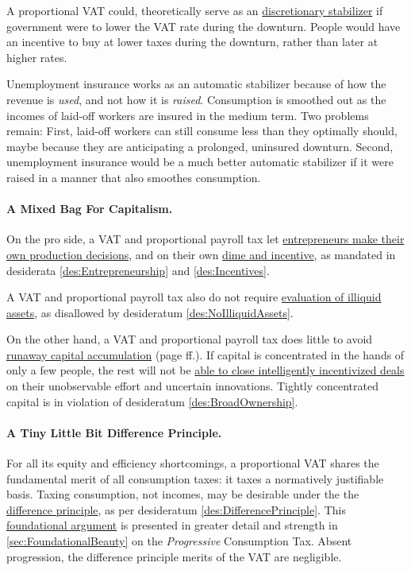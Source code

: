 A proportional VAT could, theoretically serve as an \hyperref[des:DiscretionaryStabilizer]{discretionary stabilizer} if government were to lower the VAT rate during the downturn.
People would have an incentive to buy at lower taxes during the downturn, rather than later at higher rates.

Unemployment insurance works as an automatic stabilizer because of how the revenue is \emph{used}, and not how it is \emph{raised}.
Consumption is smoothed out as the incomes of laid-off workers are insured in the medium term.
Two problems remain:
First, laid-off workers can still consume less than they optimally should, maybe because they are anticipating a prolonged, uninsured downturn.
Second, unemployment insurance would be a much better automatic stabilizer if it were raised in a manner that also smoothes consumption.

\paragraph{A Mixed Bag For Capitalism.}
On the pro side, a VAT and proportional payroll tax let \hyperref[des:Entrepreneurship]{entrepreneurs make their own production decisions}, and on their own \hyperref[des:Incentives]{dime and incentive}, as mandated in desiderata \ref{des:Entrepreneurship} and \ref{des:Incentives}.

A VAT and proportional payroll tax also do not require \hyperref[des:NoIlliquidAssets]{evaluation of illiquid assets}, as disallowed by desideratum \ref{des:NoIlliquidAssets}.

On the other hand, a VAT and proportional payroll tax does little to avoid \hyperref[sec:GovDynofIneq]{runaway capital accumulation} (page \pageref{sec:GovDynofIneq}ff.).
If capital is concentrated in the hands of only a few people, the rest will not be \hyperref[des:BroadOwnership]{able to close intelligently incentivized deals} on their unobservable effort and uncertain innovations.
Tightly concentrated capital is in violation of desideratum \ref{des:BroadOwnership}.

\paragraph{A Tiny Little Bit Difference Principle.}
For all its equity and efficiency shortcomings, a proportional VAT shares the fundamental merit of all consumption taxes:
it taxes a normatively justifiable basis.
Taxing consumption, not incomes, may be desirable under the the \hyperref[des:DifferencePrinciple]{difference principle}, as per desideratum \ref{des:DifferencePrinciple}.
This \hyperref[sec:FoundationalBeauty]{foundational argument} is presented in greater detail and strength in \ref{sec:FoundationalBeauty} on the \emph{Progressive} Consumption Tax.
Absent progression, the difference principle merits of the VAT are negligible.

